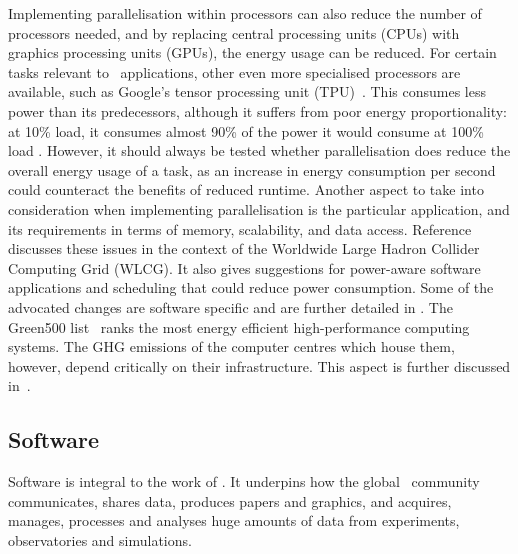 \documentclass[../SustainableHEP.tex]{subfiles}
\begin{document}
Implementing parallelisation within processors can also reduce the number of processors needed, and by replacing central processing units (CPUs) with graphics processing units (GPUs), the energy usage can be reduced.  For certain tasks relevant to \ACR\ applications, other even more specialised processors are available, such as Google's tensor processing unit (TPU)~\cite{Tensor}.  This consumes less power than its predecessors, although it suffers from poor energy proportionality: at 10\% load, it consumes almost 90\% of the power it would consume at 100\% load \cite{TensorPerformance}.
However, it should always be tested whether parallelisation does reduce the overall energy usage of a task, as an increase in energy consumption per second could counteract the benefits of reduced runtime.  Another aspect to take into consideration when implementing parallelisation is the particular application, and its requirements in terms of memory, scalability, and data access. Reference~\cite{Abdurachmanov:2014xka} discusses these issues in the context of the Worldwide Large Hadron Collider Computing Grid (WLCG).  It also gives suggestions for power-aware software applications and scheduling that could reduce power consumption.  Some of the advocated changes are software specific and are further detailed in . The Green500 list~\cite{GreenList} ranks the most energy efficient high-performance computing systems. 
The GHG emissions of the computer centres which house them, however, depend critically on their infrastructure. This aspect is further discussed in~.



\subsection{Software}\label{subsec:software}

Software is integral to the work of \ACR. It underpins how the global \ACR\ community communicates, shares data, produces papers and graphics, and acquires, manages, processes and analyses huge amounts of data from experiments, observatories and simulations.
\end{document}
